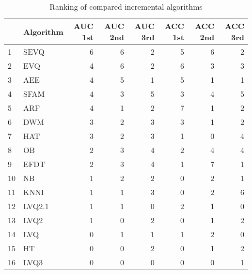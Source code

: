 \begin{table}[H]
\footnotesize
\centering
\caption{Ranking of compared incremental algorithms}
\label{tab:Incremental places}
\begin{tabular}{llrrrrrr}
\hline
{} & Algorithm &  AUC 1st &  AUC 2nd &  AUC 3rd &  ACC 1st &  ACC 2nd &  ACC 3rd \\
\hline
1  &      SEVQ &        6 &        6 &        2 &             5 &             6 &             2 \\
2  &       EVQ &        4 &        6 &        2 &             6 &             3 &             3 \\
3  &       AEE &        4 &        5 &        1 &             5 &             1 &             1 \\
4  &      SFAM &        4 &        3 &        5 &             3 &             4 &             5 \\
5  &       ARF &        4 &        1 &        2 &             7 &             1 &             2 \\
6  &       DWM &        3 &        2 &        3 &             3 &             1 &             2 \\
7  &       HAT &        3 &        2 &        3 &             1 &             0 &             4 \\
8  &        OB &        2 &        3 &        4 &             2 &             4 &             4 \\
9  &      EFDT &        2 &        3 &        4 &             1 &             7 &             1 \\
10 &        NB &        1 &        2 &        2 &             0 &             2 &             1 \\
11 &      KNNI &        1 &        1 &        3 &             0 &             2 &             6 \\
12 &    LVQ2.1 &        1 &        1 &        0 &             2 &             1 &             0 \\
13 &      LVQ2 &        1 &        0 &        2 &             0 &             1 &             2 \\
14 &       LVQ &        0 &        1 &        1 &             1 &             2 &             0 \\
15 &        HT &        0 &        0 &        2 &             0 &             1 &             2 \\
16 &      LVQ3 &        0 &        0 &        0 &             0 &             0 &             1 \\
\hline
\end{tabular}
\end{table}
